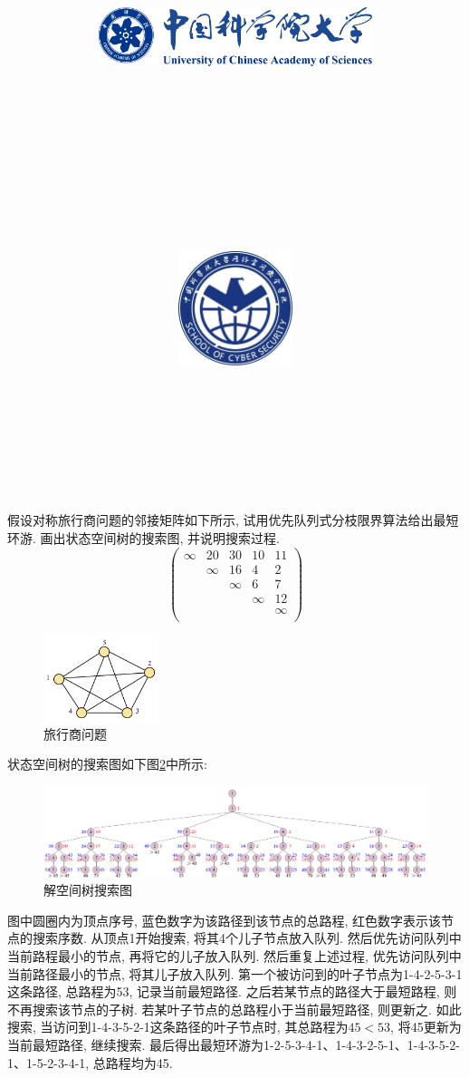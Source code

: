 \documentclass{article}
\title{
	\includegraphics[width=0.6\textwidth]{images/title/ucas_logo 1.pdf}\\
    \vspace{1in}
    \textmd{\textbf{\hmwkClass}}\\
	\textmd{\Large{\textbf{\hmwkClassID}}}\\
    \textmd{\textbf{\hmwkTitle}}\\
    \normalsize\vspace{0.1in}\large{\hmwkCompleteTime }\\
    \vspace{0.1in}\large{\textit{\hmwkClassInstructor\ }}\\
    \vspace{1in}
	\includegraphics[width=0.25\textwidth]{images/title/Cyber.jpg}\\
	\vspace{1in}
}
\author{
	\hmwkAuthorName \\ 
	\hmwkAuthorStuID \\
	\hmwkAuthorInst \\
	\hmwkAuthorzhuanye \\
	\hmwkAuthorfangxiang
	}
\date{}
\begin{document}
\maketitle


%
%
%
%
%


\pagebreak



\begin{homeworkProblem}
	假设对称旅行商问题的邻接矩阵如下所示, 试用优先队列式分枝限界算法给出最短环游. 画出状态空间树的搜索图, 并说明搜索过程.
	$$
	\left( \begin{matrix}
		\infty&		20&		30&		10&		11\\
		&		\infty&		16&		4&		2\\
		&		&		\infty&		6&		7\\
		&		&		&		\infty&		12\\
		&		&		&		&		\infty\\
	\end{matrix} \right)
	$$
	\begin{figure}[H]
		\centering
		\includegraphics[width=0.3\textwidth]{images/title/旅行商问题.pdf}
		\caption{旅行商问题}
		\label{fig:旅行商问题}
	\end{figure}
	\solution 状态空间树的搜索图如下图\ref{fig:解空间树搜索图}中所示:
	\begin{figure}[H]
		\centering
		\includegraphics[width=1.0\textwidth]{images/title/解空间树搜索图.pdf}
		\caption{解空间树搜索图}
		\label{fig:解空间树搜索图}
	\end{figure}
	图中圆圈内为顶点序号, 蓝色数字为该路径到该节点的总路程, 红色数字表示该节点的搜索序数. 从顶点1开始搜索, 将其4个儿子节点放入队列. 然后优先访问队列中当前路程最小的节点, 再将它的儿子放入队列. 然后重复上述过程, 优先访问队列中当前路径最小的节点, 将其儿子放入队列. 第一个被访问到的叶子节点为1-4-2-5-3-1这条路径, 总路程为53, 记录当前最短路径. 之后若某节点的路径大于最短路程, 则不再搜索该节点的子树. 若某叶子节点的总路程小于当前最短路径, 则更新之. 如此搜索, 当访问到1-4-3-5-2-1这条路径的叶子节点时, 其总路程为$45<53$, 将45更新为当前最短路径, 继续搜索. 最后得出最短环游为1-2-5-3-4-1、1-4-3-2-5-1、1-4-3-5-2-1、1-5-2-3-4-1, 总路程均为45.
\end{homeworkProblem}
\end{document}
